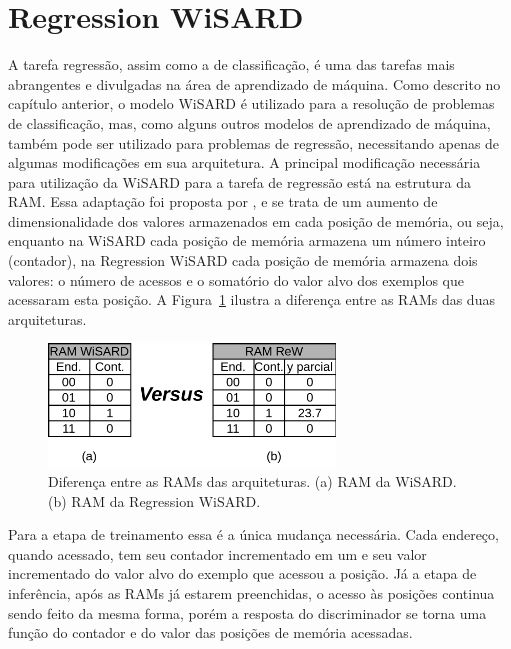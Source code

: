 \section{Regression WiSARD}
A tarefa regressão, assim como a de classificação, é uma das tarefas mais abrangentes e divulgadas na área de aprendizado de máquina. Como descrito no capítulo anterior, o modelo WiSARD é utilizado para a resolução de problemas de classificação, mas, como alguns outros modelos de aprendizado de máquina, também pode ser utilizado para problemas de regressão, necessitando apenas de algumas modificações em sua arquitetura.
A principal modificação necessária para utilização da WiSARD para a tarefa de regressão está na estrutura da RAM. Essa adaptação foi proposta por \citeauthor{rew}, \citeyear{rew} \cite{rew} e se trata de um aumento de dimensionalidade dos valores armazenados em cada posição de memória, ou seja, enquanto na WiSARD cada posição de memória armazena um número inteiro (contador), na Regression WiSARD cada posição de memória armazena dois valores: o número de acessos e o somatório do valor alvo dos exemplos que acessaram esta posição. A Figura~\ref{fig:ramxram} ilustra a diferença entre as RAMs das duas arquiteturas.

\hspace*{-1.5in}
\begin{figure}[!ht]
    \centering
    \includegraphics[width=3.0in]{img/ramxram.pdf}
    \caption{Diferença entre as RAMs das arquiteturas. (a) RAM da WiSARD. (b) RAM da Regression WiSARD.}
    \label{fig:ramxram}
\end{figure}

Para a etapa de treinamento essa é a única mudança necessária. Cada endereço, quando acessado, tem seu contador incrementado em um e seu valor incrementado do valor alvo do exemplo que acessou a posição. Já a etapa de inferência, após as RAMs já estarem preenchidas, o acesso às posições continua sendo feito da mesma forma, porém a resposta do discriminador se torna uma função do contador e do valor das posições de memória acessadas.

